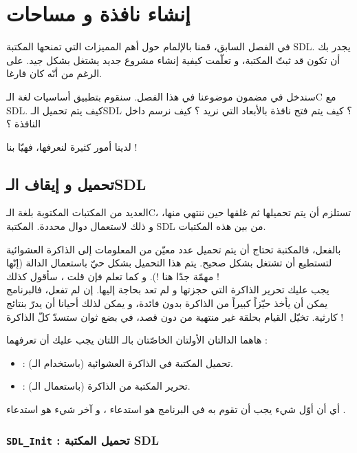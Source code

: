 \chapter{إنشاء نافذة و مساحات}

في الفصل السابق، قمنا بالإلمام حول أهم المميزات التي تمنحها المكتبة 
\textenglish{SDL}.
يجدر بك أن تكون قد ثبتّ المكتبة، و تعلّمت كيفية إنشاء مشروع جديد يشتغل بشكل جيد.  على الرغم من أنّه كان فارغا.

سندخل في مضمون موضوعنا في هذا الفصل. سنقوم بتطبيق أساسيات لغة الـ\textenglish{C}
مع
\textenglish{SDL}.
كيف يتم تحميل الـ\textenglish{SDL} ؟
كيف يتم فتح نافذة بالأبعاد التي نريد ؟ كيف نرسم داخل النافذة ؟

لدينا أمور كثيرة لنعرفها، فهيّا بنا !

\section{تحميل و إيقاف الـ\textenglish{SDL}}

العديد من المكتبات المكتوبة بلغة الـ\textenglish{C}،
تستلزم أن يتم تحميلها ثم غلقها حين ننتهي منها، و ذلك لاستعمال دوال محددة. المكتبة
\textenglish{SDL}
من بين هذه المكتبات. 

بالفعل، فالمكتبة تحتاج أن يتم تحميل عدد معيّن من المعلومات إلى الذاكرة العشوائية لتستطيع أن تشتغل بشكل صحيح. يتم هذا التحميل بشكل حيّ باستعمال الدالة 
(إنّها مهمّة جدّا هنا !). و كما تعلم فإن قلت
،
سأقول كذلك
 !\\
يجب عليك تحرير الذاكرة التي حجزتها و لم تعد بحاجة إليها. إن لم تفعل، فالبرنامج يمكن أن يأخذ حيّزاً كبيراً من الذاكرة بدون فائدة، و يمكن لذلك أحيانا أن يدرّ بنتائج كارثية. تخيّل القيام بحلقة غير منتهية من
دون قصد، في بضع ثوان ستسدّ كلّ الذاكرة !

هاهما الدالتان الأولتان الخاصّتان بالـ
اللتان يجب عليك أن تعرفهما :
\begin{itemize}
	\item {} :
	تحميل المكتبة في الذاكرة العشوائية (باستخدام الـ).
	\item {} :
	تحرير المكتبة من الذاكرة (باستعمال الـ).
\end{itemize}

أي أن أوّل شيء يجب أن تقوم به في البرنامج هو استدعاء
،
و آخر شيء هو استدعاء
.

\subsection{\texttt{SDL\_Init} : تحميل المكتبة \textenglish{SDL}}

